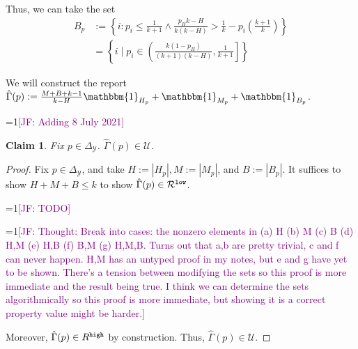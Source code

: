 \documentclass[12pt]{article}
\newcommand{\Comments}{1}
\newcommand{\mynote}[2]{\ifnum\Comments=1\textcolor{#1}{#2}\fi}
\newcommand{\jessie}[1]{\mynote{purple}{[JF: #1]}}
\newcommand{\simplex}{\Delta_\Y}
\newcommand{\R}{\mathcal{R}}
\newcommand{\U}{\mathcal{U}}
\newcommand{\Y}{\mathcal{Y}}
\newcommand{\ones}{\mathbbm{1}}
\newtheorem{claim}{Claim}
\begin{document}
Thus, we can take the set 
\begin{align*}
B_p &:= \left\{i : p_i \leq \frac{1}{k+1} \wedge \frac{p_H k- H}{k(k- H)} > \frac 1 k - p_i\left(\frac{k+1}{k}\right) \right\}\\
&=\left\{i \mid p_i \in \left(\frac {k(1-p_H)}{(k+1)(k-H)}, \frac 1 {k+1} \right]\right\}
\end{align*}


We will construct the report $\hat \Gamma(p) := \frac{M + B + k - 1}{k-H}\ones_{H_p} + \ones_{M_p} + \ones_{B_p}$.


\jessie{Adding 8 July 2021}


\begin{claim}
	Fix $p \in \simplex$.
	$\hat \Gamma(p) \in \U$.
\end{claim}	
\begin{proof}
	Fix $p \in \simplex$, and take $H := |H_p|, M:= |M_p|$, and $B := |B_p|$.
	It suffices to show $H + M + B \leq k$ to show $\hat \Gamma (p) \in \R^{\tt low}$.
	
	\jessie{TODO}
	
	
	\jessie{Thought: Break into cases: the nonzero elements in (a) H (b) M (c) B (d) H,M (e) H,B (f) B,M (g) H,M,B.  Turns out that a,b are pretty trivial, c and f can never happen.  H,M has an untyped proof in my notes, but e and g have yet to be shown.  There's a tension between modifying the sets so this proof is more immediate and the result being true.  I think we can determine the sets algorithmically so this proof is more immediate, but showing it is a correct property value might be harder.}
	
	
	Moreover, $\hat \Gamma(p) \in R^{\tt high}$ by construction.
	Thus, $\hat \Gamma(p) \in \U$.
\end{proof}
\end{document}
